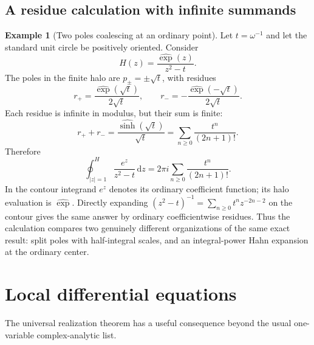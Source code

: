 \documentclass[11pt,a4paper]{article}
\theoremstyle{definition}\newtheorem{definition}[theorem]{Definition}
\newtheorem{example}[theorem]{Example}
\theoremstyle{remark}\newtheorem{remark}[theorem]{Remark}
\newcommand{\ev}[1]{\widehat{#1}}
\newcommand{\hoint}{\mathop{\oint}\nolimits^{\!H}}
\newcommand{\dd}{\,\mathrm d}
\numberwithin{equation}{section}
\begin{document}
\subsection{A residue calculation with infinite summands}
\begin{example}[Two poles coalescing at an ordinary point]\label{ex:residuesplit}
Let $t=\omega^{-1}$ and let the standard unit circle be positively oriented. Consider
\[
 H(z)=\frac{\ev{\exp}(z)}{z^2-t}.
\]
The poles in the finite halo are $p_\pm=\pm\sqrt t$, with residues
\[
 r_+=\frac{\ev{\exp}(\sqrt t)}{2\sqrt t},\qquad
 r_-=-\frac{\ev{\exp}(-\sqrt t)}{2\sqrt t}.
\]
Each residue is infinite in modulus, but their sum is finite:
\[
 r_++r_-=
 \frac{\ev{\sinh}(\sqrt t)}{\sqrt t}
 =\sum_{n\geq0}\frac{t^n}{(2n+1)!}.
\]
Therefore
\begin{equation}\label{eq:residueexample}
 \hoint_{|z|=1}\frac{e^z}{z^2-t}\dd z
 =2\pi i\sum_{n\geq0}\frac{t^n}{(2n+1)!}.
\end{equation}
In the contour integrand $e^z$ denotes its ordinary coefficient function; its halo evaluation is $\ev{\exp}$. Directly expanding
$(z^2-t)^{-1}=\sum_{n\geq0}t^nz^{-2n-2}$ on the contour gives the same answer by ordinary coefficientwise residues. Thus the calculation compares two genuinely different organizations of the same exact result: split poles with half-integral scales, and an integral-power Hahn expansion at the ordinary center.
\end{example}

\section{Local differential equations}\label{sec:ODE}
The universal realization theorem has a useful consequence beyond the usual one-variable complex-analytic list.
\end{document}
